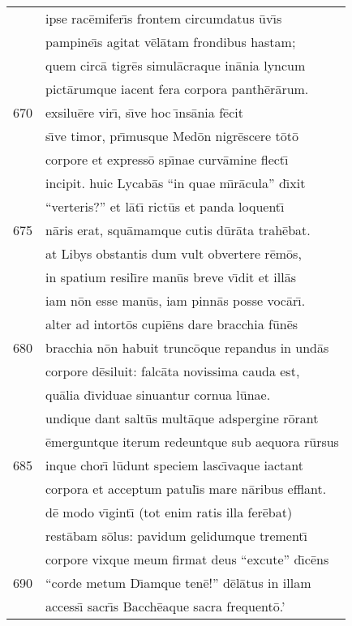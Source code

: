 \documentclass[paper=6in:9in,pagesize=pdftex,
               headinclude=on,footinclude=on,12pt]{scrbook}
\begin{document}
\begin{longtable}[p]{ r l }
 & ipse rac\=emifer\={\i}s frontem circumdatus \=uv\={\i}s\\ 
 & pampine\={\i}s agitat v\=el\=atam frondibus hastam;\\ 
 & quem circ\=a tigr\=es simul\=acraque in\=ania lyncum\\ 
 & pict\=arumque iacent fera corpora panth\=er\=arum.\\ 
670 & exsilu\=ere vir\={\i}, s\={\i}ve hoc \={\i}ns\=ania f\=ecit\\ 
 & s\={\i}ve timor, pr\={\i}musque Med\=on nigr\=escere t\=ot\=o\\ 
 & corpore et express\=o sp\={\i}nae curv\=amine flect\={\i}\\ 
 & incipit. huic Lycab\=as ``in quae m\={\i}r\=acula'' d\={\i}xit\\ 
 & ``verteris?'' et l\=at\={\i} rict\=us et panda loquent\={\i}\\ 
675 & n\=aris erat, squ\=amamque cutis d\=ur\=ata trah\=ebat.\\ 
 & at Libys obstantis dum vult obvertere r\=em\=os,\\ 
 & in spatium resil\={\i}re man\=us breve v\={\i}dit et ill\=as\\ 
 & iam n\=on esse man\=us, iam pinn\=as posse voc\=ar\={\i}.\\ 
 & alter ad intort\=os cupi\=ens dare bracchia f\=un\=es\\ 
680 & bracchia n\=on habuit trunc\=oque repandus in und\=as\\ 
 & corpore d\=esiluit: falc\=ata novissima cauda est,\\ 
 & qu\=alia d\={\i}viduae sinuantur cornua l\=unae.\\ 
 & undique dant salt\=us mult\=aque adspergine r\=orant\\ 
 & \=emerguntque iterum redeuntque sub aequora r\=ursus\\ 
685 & inque chor\={\i} l\=udunt speciem lasc\={\i}vaque iactant\\ 
 & corpora et acceptum patul\={\i}s mare n\=aribus efflant.\\ 
 & d\=e modo v\={\i}gint\={\i} (tot enim ratis illa fer\=ebat)\\ 
 & rest\=abam s\=olus: pavidum gelidumque trement\={\i}\\ 
 & corpore vixque meum firmat deus ``excute'' d\={\i}c\=ens\\ 
690 & ``corde metum D\={\i}amque ten\=e!'' d\=el\=atus in illam\\ 
 & access\={\i} sacr\={\i}s Bacch\=eaque sacra frequent\=o.'\\ 

\end{longtable}
\end{document}

